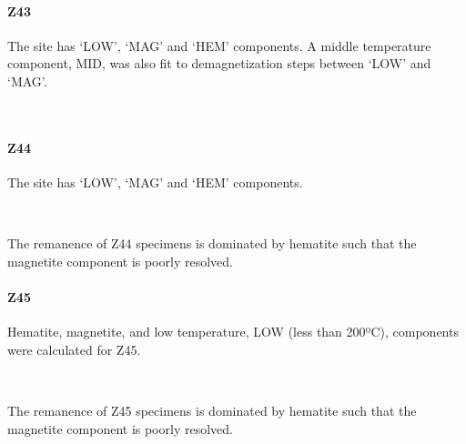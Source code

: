 \documentclass[11pt]{article}
\begin{document}
    \paragraph{Z43}\label{z43}

    The site has `LOW', `MAG' and `HEM' components. A middle temperature
component, MID, was also fit to demagnetization steps between `LOW' and
`MAG'.



    \begin{center}
    \end{center}
    { \hspace*{\fill} \\}
    
    \paragraph{Z44}\label{z44}

    The site has `LOW', `MAG' and `HEM' components.



    \begin{center}
    \end{center}
    { \hspace*{\fill} \\}
    
    The remanence of Z44 specimens is dominated by hematite such that the
magnetite component is poorly resolved.

    \paragraph{Z45}\label{z45}

    Hematite, magnetite, and low temperature, LOW (less than 200ºC),
components were calculated for Z45.



    \begin{center}
    \end{center}
    { \hspace*{\fill} \\}
    
    The remanence of Z45 specimens is dominated by hematite such that the
magnetite component is poorly resolved.
\end{document}
